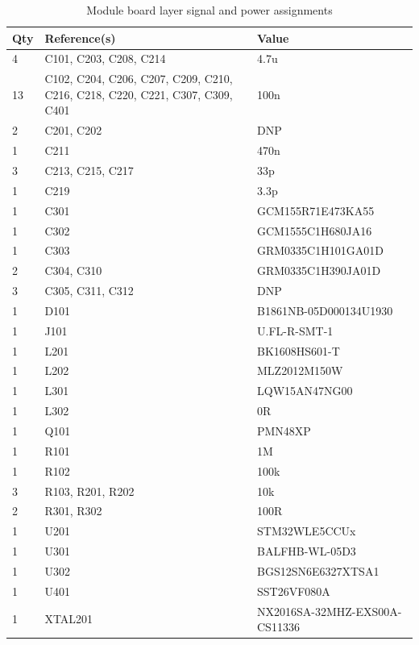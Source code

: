 \begin{table}[H]
    \begin{center}
    \caption{\label{table:board-layers}Module board layer signal and power assignments}
        \begin{tabular}{|l|l|l|} \hline
Qty &	Reference(s) &	Value \\ \hline
    4   & C101, C203, C208, C214 & 4.7u \\ \hline
    13  & C102, C204, C206, C207, C209, C210, C216, C218, C220, C221, C307, C309, C401 & 100n \\ \hline
    2   & C201, C202 & DNP \\ \hline
    1   & C211 & 470n \\ \hline
    3   & C213, C215, C217 &	33p \\ \hline
    1   & C219	& 3.3p \\ \hline
    1   & C301	& GCM155R71E473KA55 \\ \hline
    1   & C302	& GCM1555C1H680JA16 \\ \hline
    1   & C303	& GRM0335C1H101GA01D \\ \hline
    2   & C304, C310	& GRM0335C1H390JA01D \\ \hline
    3   & C305, C311, C312	& DNP \\ \hline
    1   & D101	& B1861NB-05D000134U1930 \\ \hline
    1   & J101	& U.FL-R-SMT-1 \\ \hline
    1   & L201	& BK1608HS601-T \\ \hline
    1   & L202	& MLZ2012M150W \\ \hline
    1   & L301	& LQW15AN47NG00 \\ \hline
    1   & L302	& 0R \\ \hline
    1   & Q101	& PMN48XP \\ \hline
    1   & R101	& 1M \\ \hline
    1   & R102	& 100k \\ \hline
    3   & R103, R201, R202	& 10k \\ \hline
    2   & R301, R302	& 100R \\ \hline
    1   & U201	& STM32WLE5CCUx \\ \hline
    1   & U301	& BALFHB-WL-05D3 \\ \hline
    1   & U302	& BGS12SN6E6327XTSA1 \\ \hline
    1   & U401	& SST26VF080A \\ \hline
    1   & XTAL201 &	NX2016SA-32MHZ-EXS00A-CS11336 \\ \hline
\end{tabular}
\end{center}
\end{table}

